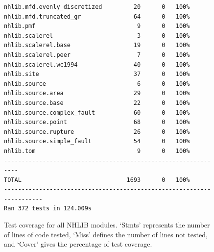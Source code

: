 \documentclass[11pt,a4paper,headings=small,dvips]{scrartcl}
\begin{document}
\begin{figure}[htbp]
\begin{Verbatim}[frame=single, commandchars=\\\{\}, fontsize=\scriptsize,samepage=true]
nhlib.mfd.evenly_discretized         20      0   100%   
nhlib.mfd.truncated_gr               64      0   100%   
nhlib.pmf                             9      0   100%   
nhlib.scalerel                        3      0   100%   
nhlib.scalerel.base                  19      0   100%   
nhlib.scalerel.peer                   7      0   100%   
nhlib.scalerel.wc1994                40      0   100%   
nhlib.site                           37      0   100%   
nhlib.source                          6      0   100%   
nhlib.source.area                    29      0   100%   
nhlib.source.base                    22      0   100%   
nhlib.source.complex_fault           60      0   100%   
nhlib.source.point                   68      0   100%   
nhlib.source.rupture                 26      0   100%   
nhlib.source.simple_fault            54      0   100%   
nhlib.tom                             9      0   100%   
---------------------------------------------------------------
TOTAL                              1693      0   100%   
----------------------------------------------------------------------
Ran 372 tests in 124.009s
\end{Verbatim}
\caption{Test coverage for all NHLIB modules. `Stmts' represents the number of lines of code tested, `Miss' defines the number of lines not tested, and `Cover' gives the percentage of test coverage.}
\label{fig:testcoverage}
\end{figure}

\cleardoublepage


\cleardoublepage
\end{document}
